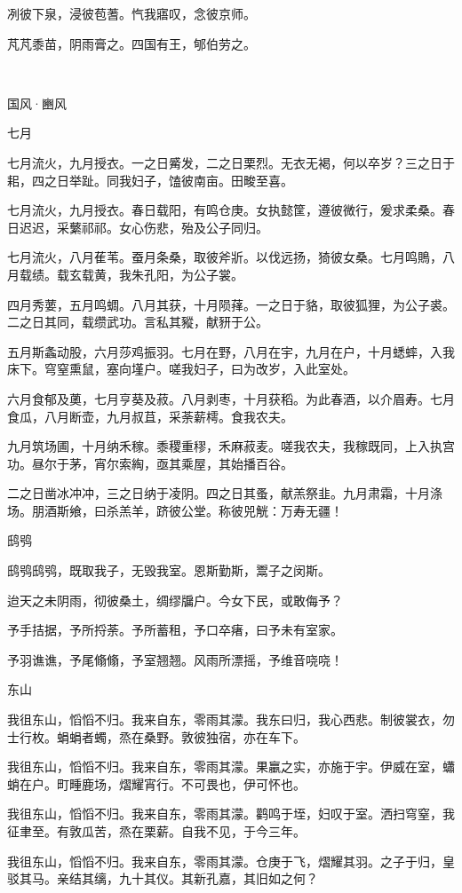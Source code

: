 冽彼下泉，浸彼苞蓍。忾我寤叹，念彼京师。

芃芃黍苗，阴雨膏之。四国有王，郇伯劳之。

　


国风·豳风


七月

七月流火，九月授衣。一之日觱发，二之日栗烈。无衣无褐，何以卒岁？三之日于耜，四之日举趾。同我妇子，馌彼南亩。田畯至喜。

七月流火，九月授衣。春日载阳，有鸣仓庚。女执懿筐，遵彼微行，爰求柔桑。春日迟迟，采蘩祁祁。女心伤悲，殆及公子同归。

七月流火，八月萑苇。蚕月条桑，取彼斧斨。以伐远扬，猗彼女桑。七月鸣鵙，八月载绩。载玄载黄，我朱孔阳，为公子裳。

四月秀葽，五月鸣蜩。八月其获，十月陨萚。一之日于貉，取彼狐狸，为公子裘。二之日其同，载缵武功。言私其豵，献豜于公。

五月斯螽动股，六月莎鸡振羽。七月在野，八月在宇，九月在户，十月蟋蟀，入我床下。穹窒熏鼠，塞向墐户。嗟我妇子，曰为改岁，入此室处。

六月食郁及薁，七月亨葵及菽。八月剥枣，十月获稻。为此春酒，以介眉寿。七月食瓜，八月断壶，九月叔苴，采荼薪樗。食我农夫。

九月筑场圃，十月纳禾稼。黍稷重穋，禾麻菽麦。嗟我农夫，我稼既同，上入执宫功。昼尔于茅，宵尔索綯，亟其乘屋，其始播百谷。

二之日凿冰冲冲，三之日纳于凌阴。四之日其蚤，献羔祭韭。九月肃霜，十月涤场。朋酒斯飨，曰杀羔羊，跻彼公堂。称彼兕觥：万寿无疆！

鸱鸮

鸱鸮鸱鸮，既取我子，无毁我室。恩斯勤斯，鬻子之闵斯。

迨天之未阴雨，彻彼桑土，绸缪牖户。今女下民，或敢侮予？

予手拮据，予所捋荼。予所蓄租，予口卒瘏，曰予未有室家。

予羽谯谯，予尾翛翛，予室翘翘。风雨所漂摇，予维音哓哓！

东山

我徂东山，慆慆不归。我来自东，零雨其濛。我东曰归，我心西悲。制彼裳衣，勿士行枚。蜎蜎者蠋，烝在桑野。敦彼独宿，亦在车下。

我徂东山，慆慆不归。我来自东，零雨其濛。果臝之实，亦施于宇。伊威在室，蠨蛸在户。町畽鹿场，熠耀宵行。不可畏也，伊可怀也。

我徂东山，慆慆不归。我来自东，零雨其濛。鹳鸣于垤，妇叹于室。洒扫穹窒，我征聿至。有敦瓜苦，烝在栗薪。自我不见，于今三年。

我徂东山，慆慆不归。我来自东，零雨其濛。仓庚于飞，熠耀其羽。之子于归，皇驳其马。亲结其缡，九十其仪。其新孔嘉，其旧如之何？

